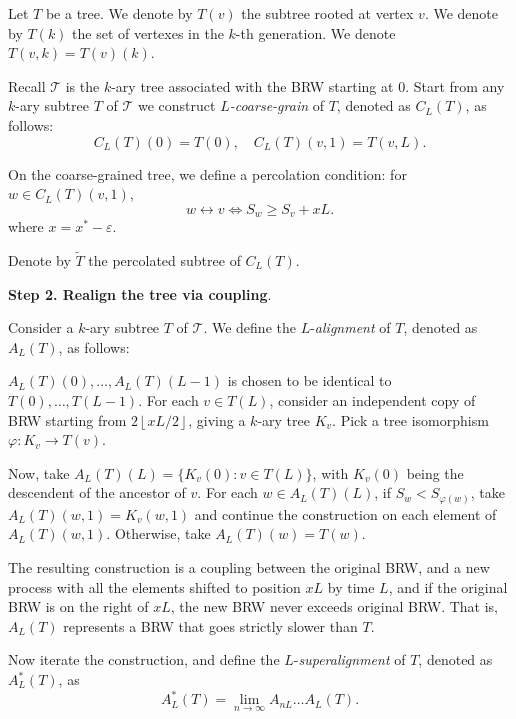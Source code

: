 
Let $T$ be a tree. We denote by $T(v)$ the subtree rooted at vertex $v$. We denote by $T(k)$ the set of vertexes in the $k$-th generation. We denote $T(v, k) = T(v)(k)$.

Recall $\mathcal{T}$ is the $k$-ary tree associated with the BRW starting at $0$. Start from any $k$-ary subtree $T$ of $\mathcal{T}$ we construct $L$\textit{-coarse-grain} of $T$, denoted as $C_L(T)$, as follows:
\[
	C_L(T)(0) = T(0), \quad C_L(T)(v, 1) = T(v, L)
.\] 

On the coarse-grained tree, we define a percolation condition: for $w \in C_L(T)(v, 1)$,
\[
	w \leftrightarrow v \iff  S_w \ge S_v + x L
.\] 
where $x = x^* - \varepsilon$.

Denote by $\tilde T$ the percolated subtree of $C_L(T)$.



\textbf{Step 2. Realign the tree via coupling}. 

Consider a $k$-ary subtree $T$ of $\mathcal{T}$. We define the $L$-\textit{alignment} of $T$, denoted as $A_L(T)$, as follows:

$A_L(T)(0), \ldots, A_L(T)(L - 1)$ is chosen to be identical to $T(0), \ldots, T(L - 1)$. For each $v \in T(L)$, consider an independent copy of BRW starting from $2 \left\lfloor x L / 2 \right\rfloor$, giving a $k$-ary tree $K_v$. Pick a tree isomorphism $\varphi: K_v \to  T(v)$.

Now, take $A_L(T)(L) = \{ K_v(0): v \in T(L)\} $, with $K_v(0)$ being the descendent of the ancestor of $v$. For each $w \in A_L(T)(L)$, if $S_w < S_{\varphi(w)}$, take $A_L(T)(w, 1) = K_v(w, 1)$ and continue the construction on each element of $A_L(T)(w, 1)$. Otherwise, take $A_L(T)(w) = T(w)$.

The resulting construction is a coupling between the original BRW, and a new process with all the elements shifted to position  $xL$ by time $L$, and if the original BRW is on the right of $xL$, the new BRW never exceeds original BRW. That is, $A_L(T)$ represents a BRW that goes strictly slower than $T$.

Now iterate the construction, and define the $L$-\textit{superalignment} of $T$, denoted as $A^*_L(T)$, as
\[
	A^*_L(T) = \lim_{n \to \infty } A_{n L} \ldots A_{L} (T)
.\] 

